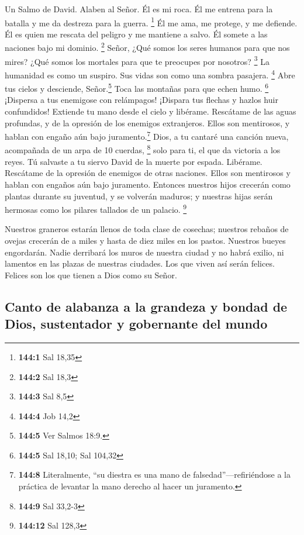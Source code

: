 Un Salmo de David.  Alaben al Señor. Él es mi roca. Él me
entrena para la batalla y me da destreza para la guerra. \footnote{\textbf{144:1}
  Sal 18,35}  Él me ama, me protege, y me defiende. Él es
quien me rescata del peligro y me mantiene a salvo. Él somete a las
naciones bajo mi dominio. \footnote{\textbf{144:2} Sal 18,3}
 Señor, ¿Qué somos los seres humanos para que nos mires?
¿Qué somos los mortales para que te preocupes por nosotros? \footnote{\textbf{144:3}
  Sal 8,5}  La humanidad es como un suspiro. Sus vidas son
como una sombra pasajera. \footnote{\textbf{144:4} Job 14,2}
 Abre tus cielos y desciende, Señor.\footnote{\textbf{144:5}
  Ver Salmos 18:9.} Toca las montañas para que echen humo. \footnote{\textbf{144:5}
  Sal 18,10; Sal 104,32}  ¡Dispersa a tus enemigose con
relámpagos! ¡Dispara tus flechas y hazlos huir confundidos!
 Extiende tu mano desde el cielo y libérame. Rescátame de
las aguas profundas, y de la opresión de los enemigos extranjeros.
 Ellos son mentirosos, y hablan con engaño aún bajo
juramento.\footnote{\textbf{144:8} Literalmente, ``su diestra es una
  mano de falsedad''---refiriéndose a la práctica de levantar la mano
  derecho al hacer un juramento.}  Dios, a tu cantaré una
canción nueva, acompañada de un arpa de 10 cuerdas, \footnote{\textbf{144:9}
  Sal 33,2-3}  solo para ti, el que da victoria a los
reyes. Tú salvaste a tu siervo David de la muerte por espada.
 Libérame. Rescátame de la opresión de enemigos de otras
naciones. Ellos son mentirosos y hablan con engaños aún bajo juramento.
 Entonces nuestros hijos crecerán como plantas durante su
juventud, y se volverán maduros; y nuestras hijas serán hermosas como
los pilares tallados de un palacio. \footnote{\textbf{144:12} Sal 128,3}

 Nuestros graneros estarán llenos de toda clase de
cosechas; nuestros rebaños de ovejas crecerán de a miles y hasta de diez
miles en los pastos.  Nuestros bueyes engordarán. Nadie
derribará los muros de nuestra ciudad y no habrá exilio, ni lamentos en
las plazas de nuestras ciudades.  Los que viven así serán
felices. Felices son los que tienen a Dios como su Señor.

\hypertarget{canto-de-alabanza-a-la-grandeza-y-bondad-de-dios-sustentador-y-gobernante-del-mundo}{%
\subsection{Canto de alabanza a la grandeza y bondad de Dios,
sustentador y gobernante del
mundo}\label{canto-de-alabanza-a-la-grandeza-y-bondad-de-dios-sustentador-y-gobernante-del-mundo}}

